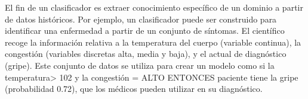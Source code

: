 	El fin de un clasificador es extraer conocimiento específico de un dominio a partir de datos históricos. Por ejemplo, un clasificador puede ser construido para identificar una enfermedad a partir de un conjunto de síntomas. El científico recoge la información relativa a la temperatura del cuerpo (variable continua), la congestión (variables discretas alta, media y baja), y el actual de diagnóstico (gripe). Este conjunto de datos se utiliza para crear un modelo como si la temperatura> 102 y la congestión = ALTO ENTONCES paciente tiene la gripe (probabilidad 0.72), que los médicos pueden utilizar en su diagnóstico.
